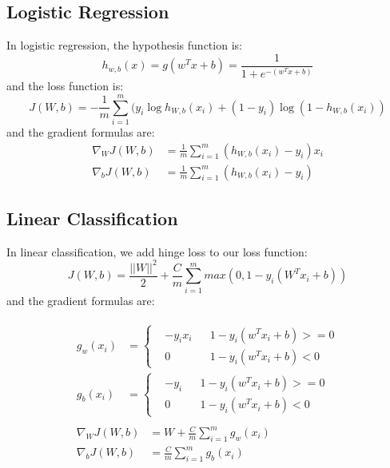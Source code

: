 \documentclass[journal, a4paper]{IEEEtran}
\begin{document}
\subsection{Logistic Regression}
In logistic regression, the hypothesis function is:
\begin{equation} \label{eq:logistic hypothesis function}
    h_{w,b}(x) = g(w^Tx+b) = \frac{1}{1+e^{-(w^Tx+b)}}
\end{equation}
and the loss function is:
\begin{equation} \label{eq:logistic regression loss function}
    J(W,b) = -\frac{1}{m}\sum_{i=1}^m(y_i\log{h_{W,b}(x_i)}+(1-y_i)\log{(1-h_{W,b}(x_i))}
\end{equation} 
and the gradient formulas are:
\begin{equation} \label{eq:logistic regression gradient formula}
    \begin{aligned}
        \nabla_WJ(W,b)&=\frac{1}{m}\sum_{i=1}^m(h_{W,b}(x_i)-y_i)x_i\\
        \nabla_bJ(W,b)&=\frac{1}{m}\sum_{i=1}^m(h_{W,b}(x_i)-y_i)
    \end{aligned}
\end{equation}

\subsection{Linear Classification}
In linear classification, we add hinge loss to our loss function:
\begin{equation} \label{eq:linear classification loss function}
    J(W,b) = \frac{||W||^2}2+\frac{C}m\sum_{i=1}^{m}max(0,1-y_i(W^Tx_i+b))
\end{equation}
and the gradient formulas are:

\begin{equation} \label{eq:linear classification gradient formula}
    \begin{aligned}
        \begin{aligned}
            g_w(x_i) &= \left\{
                \begin{aligned} 
                    & -y_ix_i & &1-y_i(w^Tx_i+b)>=0 \\
                    & 0 & & 1-y_i(w^Tx_i+b)<0
                \end{aligned}
            \right. \\
            g_b(x_i) &= \left\{
                \begin{aligned} 
                    & -y_i & &1-y_i(w^Tx_i+b)>=0 \\
                    & 0 & & 1-y_i(w^Tx_i+b)<0
                \end{aligned}
            \right. 
        \end{aligned}\\
        \begin{aligned}
            \nabla_WJ(W,b) &= W+\frac{C}m\sum_{i=1}^{m}g_w(x_i)\\
            \nabla_bJ(W,b) &= \frac{C}m\sum_{i=1}^{m}g_b(x_i)
        \end{aligned}
    \end{aligned}
\end{equation}
\end{document}
